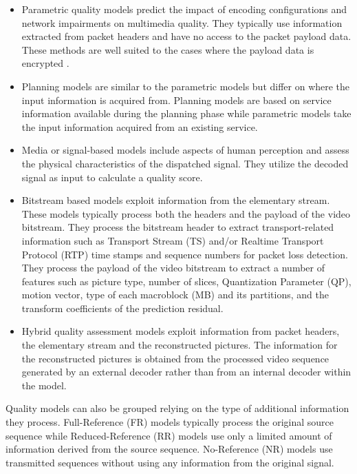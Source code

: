 \documentclass[journal]{IEEEtran}
\begin{document}
\begin{itemize}

\item Parametric quality models predict the impact of encoding configurations and network impairments on multimedia quality. They typically use information extracted from packet headers and have no access to the packet payload data. These methods are well suited to the cases where the payload data is encrypted \cite{dubin2016real}.

\item Planning models are similar to the parametric models but differ on where the input information is acquired from. Planning models are based on service information available during the planning phase while parametric models take the input information acquired from an existing service.

\item Media or signal-based models include aspects of human perception and assess the physical characteristics of the dispatched signal. They utilize the decoded signal as input to calculate a quality score.

\item Bitstream based models exploit information from the elementary stream. These models typically process both the headers and the payload of the video bitstream. They process the bitstream header to extract transport-related information such as Transport Stream (TS) and/or Realtime Transport Protocol (RTP) time stamps and sequence numbers for packet loss detection. They process the payload of the video bitstream to extract a number of features such as picture type, number of slices, Quantization Parameter (QP), motion vector, type of each macroblock (MB) and its partitions, and the transform coefficients of the prediction residual.

\item Hybrid quality assessment models exploit information from packet headers, the elementary stream and the reconstructed pictures. The information for the reconstructed pictures is obtained from the processed video sequence generated by an external decoder rather than from an internal decoder within the model.

\end{itemize}

Quality models can also be grouped relying on the type of additional information they process. Full-Reference (FR) models typically process the original source sequence while Reduced-Reference (RR) models use only a limited amount of information derived from the source sequence. No-Reference (NR) models use transmitted sequences without using any information from the original signal.
\end{document}
